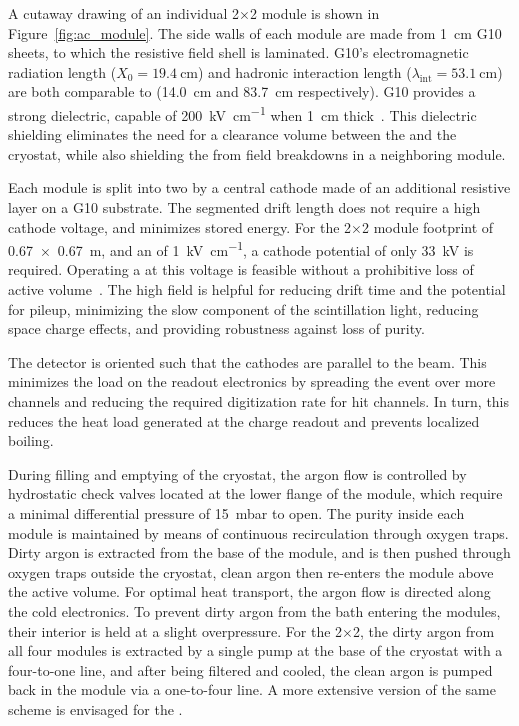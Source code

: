A cutaway drawing of an individual 2$\times$2 module is shown in Figure~\ref{fig:ac_module}. The side walls of each module are made from \SI{1}{\centi\metre} G10 sheets, to which the resistive field shell is laminated. G10's electromagnetic radiation length ($X_{\mathrm{0}} = \SI{19.4}{\centi\metre}$) and hadronic interaction length ($\lambda_{\mathrm{int}} = \SI{53.1}{\centi\metre}$)~\cite{Tanabashi:2018oca} %
are both comparable to  (14.0~cm and 83.7~cm respectively).
G10 provides a strong dielectric, capable of \SI{200}{\kilo\volt\per\centi\metre} when \SI{1}{\centi\metre} thick~\cite{G10Breakdown}. This dielectric shielding eliminates the need for a clearance volume between the  and the cryostat, while also shielding the  from field breakdowns in a neighboring module. 

Each module is split into two  by a central cathode made of an additional resistive layer on a G10 substrate. The segmented drift length does not require a high cathode voltage, and minimizes stored energy. For the 2$\times$2 module footprint of \SI{0.67 x 0.67}{\metre}, and an \efield of \SI{1}{\kilo\volt\per\centi\metre}, a cathode potential of only \SI{33}{\kilo\volt} is required. Operating a  at this voltage is feasible without a prohibitive loss of active volume~\cite{Zeller:2013sva}.  The high field is helpful for reducing drift time and the potential for pileup, minimizing the slow component of the scintillation light, reducing space charge effects, and providing robustness against loss of  purity.  

The detector is oriented such that the cathodes are parallel to the beam. This minimizes the load on the readout electronics by spreading the event over more channels and reducing the required digitization rate for hit channels. In turn, this reduces the heat load generated at the charge readout and prevents localized boiling.

During filling and emptying of the cryostat, the argon flow is controlled by hydrostatic check valves located at the lower flange of the module, which require a minimal differential pressure of \SI{15}{\milli\bar} to open. The purity inside each module is maintained by means of continuous  recirculation through oxygen traps. Dirty argon is extracted from the base of the module, and is then pushed through oxygen traps outside the cryostat, clean argon then re-enters the module above the active volume. For optimal heat transport, the argon flow is directed along the cold electronics. To prevent dirty argon from the bath entering the modules, their interior is held at a slight overpressure. For the 2$\times$2, the dirty argon from all four modules is extracted by a single pump at the base of the cryostat with a four-to-one line, and after being filtered and cooled, the clean argon is pumped back in the module via a one-to-four line.
A more extensive version of the same scheme is envisaged for the  .  



